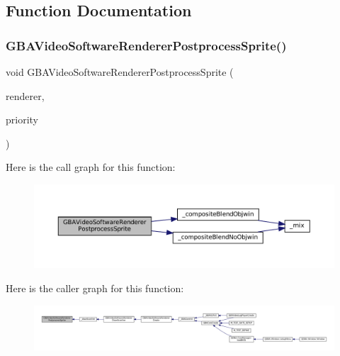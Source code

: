 \subsection{Function Documentation}
\mbox{\label{software-obj_8c_a47b212d8fd0ffc36105a78d71946516b}} 
\subsubsection{\texorpdfstring{G\+B\+A\+Video\+Software\+Renderer\+Postprocess\+Sprite()}{GBAVideoSoftwareRendererPostprocessSprite()}}
{\footnotesize\ttfamily void G\+B\+A\+Video\+Software\+Renderer\+Postprocess\+Sprite (\begin{DoxyParamCaption}\item[{struct G\+B\+A\+Video\+Software\+Renderer $\ast$}]{renderer,  }\item[{unsigned}]{priority }\end{DoxyParamCaption})}

Here is the call graph for this function\+:
\nopagebreak
\begin{figure}[H]
\begin{center}
\leavevmode
\includegraphics[width=350pt]{software-obj_8c_a47b212d8fd0ffc36105a78d71946516b_cgraph}
\end{center}
\end{figure}
Here is the caller graph for this function\+:
\nopagebreak
\begin{figure}[H]
\begin{center}
\leavevmode
\includegraphics[width=350pt]{software-obj_8c_a47b212d8fd0ffc36105a78d71946516b_icgraph}
\end{center}
\end{figure}
\mbox{\label{software-obj_8c_a1f995eed921e1b4e0963fab4daf5e2da}} 
